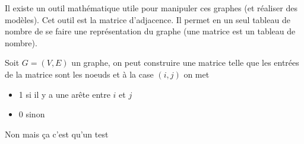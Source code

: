 \documentclass[12pt,fleqn]{article} %
\begin{document}
Il existe un outil mathématique utile pour manipuler ces graphes (et réaliser des modèles). Cet outil est la matrice d'adjacence. Il permet en un seul tableau de nombre de se faire une représentation du graphe (une matrice est un tableau de nombre).
\begin{definition}
	Soit $G = (V,E)$ un graphe, on peut construire une matrice telle que les entrées de la matrice sont les noeuds et à la case $(i,j)$ on met \begin{itemize}
		\item 1 si il y a une arête entre $i$ et $j$
		\item 0 sinon
	\end{itemize}
\end{definition}


Non mais ça c'est qu'un test
\end{document}
